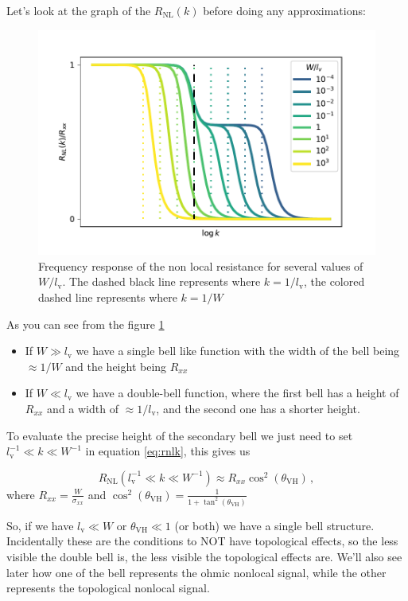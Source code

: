 Let's look at the graph of the $R_{\textrm{NL}}(k)$ before doing any approximations:
\begin{figure}[h!]
    \centering
    \includegraphics[width=\linewidth]{Immagini/rnl/widths.pdf}
    \caption{Frequency response of the non local resistance for several values of $W/l_\textrm{v}$. The dashed black line represents where $k=1/l_\textrm{v}$, the colored dashed line represents where $k=1/W$}
    \label{fig:RNLk}
\end{figure}
As you can see from the figure \ref{fig:RNLk} 
\begin{itemize}
    \item If $W\gg l_\textrm{v}$ we have a single bell like function with the width of the bell being $\approx 1/W$ and the height being $R_{xx}$ 
    \item If $W\ll l_\textrm{v}$ we have a double-bell function, where the first bell has a height of $R_{xx}$ and a width of $\approx 1/l_\textrm{v}$, and the second one has a shorter height.
\end{itemize}    
To evaluate the precise height of the secondary bell we just need to set $l_\textrm{v}^{-1}\ll k \ll W^{-1}$ in equation \ref{eq:rnlk}, this gives us

\begin{equation}
    R_{\textrm{NL}}(l_\textrm{v}^{-1}\ll k \ll W^{-1})\approx R_{xx}\cos^2(\theta_{\textrm{VH}})\,, 
    \label{eq:plateau} 
\end{equation}
where $R_{xx}=\frac{W}{\sigma_{xx}}$ and $\cos^2(\theta_{\textrm{VH}})=\frac{1}{1+\tan^2(\theta_{\textrm{VH}})}$

So, if we have $l_\textrm{v}\ll W$ or $\theta_{\textrm{VH}}\ll 1$ (or both) we have a single bell structure. Incidentally these are the conditions to NOT have topological effects, so the less visible the double bell is, the less visible the topological effects are. We'll also see later how one of the bell represents the ohmic nonlocal signal, while the other represents the topological nonlocal signal. 

